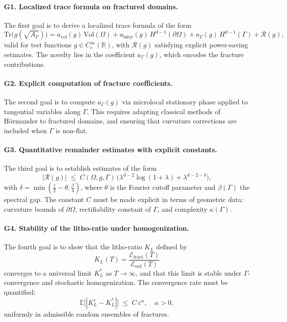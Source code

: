 \paragraph{G1. Localized trace formula on fractured domains.}
The first goal is to derive a localized trace formula of the form
\[
\mathrm{Tr}\big(g(\sqrt{A_\Gamma})\big) 
 = a_{\mathrm{vol}}(g)\,\mathrm{Vol}(\Omega)
 + a_{\mathrm{bdry}}(g)\,H^{d-1}(\partial\Omega)
 + a_{\Gamma}(g)\,H^{d-1}(\Gamma)
 + \mathcal{R}(g),
\]
valid for test functions $g\in C_c^\infty(\mathbb{R})$, with
$\mathcal{R}(g)$ satisfying explicit power-saving estimates.
The novelty lies in the coefficient $a_\Gamma(g)$, which encodes the
fracture contributions.

\paragraph{G2. Explicit computation of fracture coefficients.}
The second goal is to compute $a_\Gamma(g)$ via microlocal stationary phase
applied to tangential variables along $\Gamma$. This requires adapting
classical methods of Hörmander \cite{Hormander1985} to fractured domains,
and ensuring that curvature corrections are included when $\Gamma$ is
non-flat.

\paragraph{G3. Quantitative remainder estimates with explicit constants.}
The third goal is to establish estimates of the form
\[
\lvert \mathcal{R}(g) \rvert \;\leq\; 
C(\Omega,g,\Gamma) \,
\Big( \lambda^{d-2} \log(1+\lambda) + \lambda^{d-2-\delta} \Big),
\]
with $\delta = \min(\tfrac{1}{2}-\theta,\tfrac{\beta}{4})$,
where $\theta$ is the Fourier cutoff parameter and $\beta(\Gamma)$ the
spectral gap. The constant $C$ must be made explicit in terms of geometric
data: curvature bounds of $\partial\Omega$, rectifiability constant of
$\Gamma$, and complexity $\kappa(\Gamma)$.

\paragraph{G4. Stability of the litho-ratio under homogenization.}
The fourth goal is to show that the litho-ratio $K_L$ defined by
\[
K_L(T) = \frac{\mathcal{E}_{\text{fract}}(T)}{\mathcal{E}_{\text{ord}}(T)}
\]
converges to a universal limit $K_L^*$ as $T\to\infty$, and that this limit
is stable under $\Gamma$-convergence and stochastic homogenization.
The convergence rate must be quantified:
\[
\mathbb{E}\bigl[ |K_L^\varepsilon - K_L^*| \bigr]
  \;\leq\; C \, \varepsilon^\alpha, \quad \alpha>0,
\]
uniformly in admissible random ensembles of fractures.

